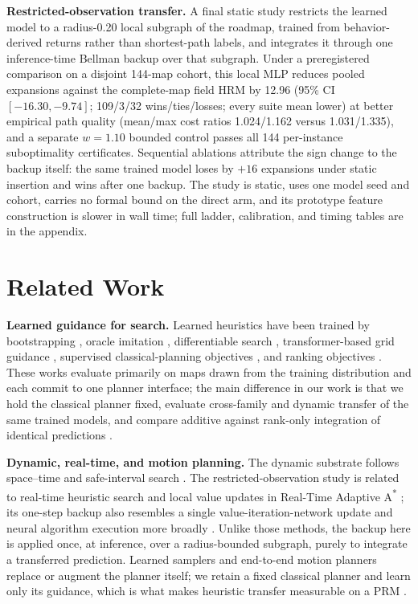 \documentclass[letterpaper]{article} %
\begin{document}
\textbf{Restricted-observation transfer.} A final static study restricts the learned model to a radius-0.20 local subgraph of the roadmap, trained from behavior-derived returns rather than shortest-path labels, and integrates it through one inference-time Bellman backup over that subgraph. Under a preregistered comparison on a disjoint 144-map cohort, this local MLP reduces pooled expansions against the complete-map field HRM by 12.96 (95\% CI $[-16.30,-9.74]$; 109/3/32 wins/ties/losses; every suite mean lower) at better empirical path quality (mean/max cost ratios 1.024/1.162 versus 1.031/1.335), and a separate $w{=}1.10$ bounded control passes all 144 per-instance suboptimality certificates. Sequential ablations attribute the sign change to the backup itself: the same trained model loses by $+16$ expansions under static insertion and wins after one backup. The study is static, uses one model seed and cohort, carries no formal bound on the direct arm, and its prototype feature construction is slower in wall time; full ladder, calibration, and timing tables are in the appendix.

\section{Related Work}

\textbf{Learned guidance for search.} Learned heuristics have been trained by bootstrapping \citep{arfaee2011bootstrap}, oracle imitation \citep{bhardwaj2017sail}, differentiable search \citep{yonetani2021neuralastar}, transformer-based grid guidance \citep{kirilenko2023transpath}, supervised classical-planning objectives \citep{ferber2020neural}, and ranking objectives \citep{chrestien2023rank}. These works evaluate primarily on maps drawn from the training distribution and each commit to one planner interface; the main difference in our work is that we hold the classical planner fixed, evaluate cross-family and dynamic transfer of the same trained models, and compare additive against rank-only integration of identical predictions \citep{pohl1970,pearl1982semiadmissible,aine2016mha}.

\textbf{Dynamic, real-time, and motion planning.} The dynamic substrate follows space--time and safe-interval search \citep{silver2005cooperative,phillips2011sipp}. The restricted-observation study is related to real-time heuristic search \citep{korf1990rta} and local value updates in Real-Time Adaptive A\textsuperscript{*} \citep{koenig2006rtaa}; its one-step backup also resembles a single value-iteration-network update \citep{tamar2016vin,lee2018gppn} and neural algorithm execution more broadly \citep{velickovic2021nar}. Unlike those methods, the backup here is applied once, at inference, over a radius-bounded subgraph, purely to integrate a transferred prediction. Learned samplers and end-to-end motion planners \citep{ichter2018sampling,qureshi2019mpnet} replace or augment the planner itself; we retain a fixed classical planner and learn only its guidance, which is what makes heuristic transfer measurable on a PRM \citep{kavraki1996prm}.
\end{document}
